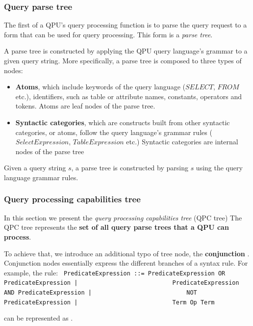 \subsubsection{Query parse tree}

The first of a QPU's query processing function is to parse the query request to a form that can be used for query processing.
This form is a \textit{parse tree}.

A parse tree is constructed by applying the QPU query language's grammar to a given query string.
More specifically, a parse tree is composed to three types of nodes:
\begin{itemize}
  \item \textbf{Atoms}, which include keywords of the query language ($SELECT$, $FROM$ etc.),
  identifiers, such as table or attribute names, constants, operators and tokens.
  Atoms are leaf nodes of the parse tree.

  \item \textbf{Syntactic categories}, which are constructs built from other syntactic categories, or atoms,
  follow the query language's grammar rules ($SelectExpression$, $TableExpression$ etc.)
  Syntactic categories are internal nodes of the parse tree
\end{itemize}

Given a query string $s$, a parse tree is constructed by parsing $s$ using the query language grammar rules.

\subsubsection{Query processing capabilities tree}

In this section we present the \textit{query processing capabilities tree} (QPC tree)
The QPC tree represents the \textbf{set of all query parse trees that a QPU can process}.

To achieve that, we introduce an additional typo of tree node, the \textbf{conjunction} .
Conjunction nodes essentially express the different branches of a syntax rule.
For example, the rule:
{\obeylines\obeyspaces
\texttt{
PredicateExpression  ::=  PredicateExpression OR PredicateExpression |
~~~~~~~~~~~~~~~~~~~~~~~~~~PredicateExpression AND PredicateExpression |
~~~~~~~~~~~~~~~~~~~~~~~~~~NOT PredicateExpression |
~~~~~~~~~~~~~~~~~~~~~~~~~~Term Op Term
}}

can be represented as .


